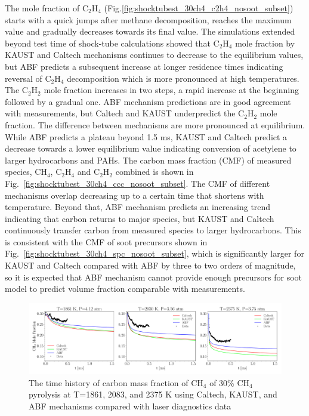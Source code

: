  The mole fraction of $\mathrm{C_2H_4}$ (Fig.\ref{fig:shocktubest_30ch4_c2h4_nosoot_subset}) starts with a quick jumps after methane decomposition, reaches the maximum value and gradually decreases towards its final value. The simulations extended beyond test time of shock-tube calculations showed that $\mathrm{C_2H_4}$ mole fraction by KAUST and Caltech mechanisms continues to decrease to the equilibrium values, but ABF predicts a subsequent increase at longer residence times indicating reversal of $\mathrm{C_2H_4}$ decomposition which is more pronounced at high temperatures. The $\mathrm{C_2H_2}$ mole fraction increases in two steps, a rapid increase at the beginning followed by a gradual one. ABF mechanism predictions are in good agreement with measurements, but Caltech and KAUST underpredict the $\mathrm{C_2H_2}$ mole fraction. The difference between mechanisms are more pronounced at equilibrium. While ABF predicts a plateau beyond 1.5 ms, KAUST and Caltech predict a decrease towards a lower equilibrium value indicating conversion of acetylene to larger hydrocarbons and PAHs. The carbon mass fraction (CMF) of measured species, $\mathrm{CH_4}$, $\mathrm{C_2H_4}$ and $\mathrm{C_2H_2}$ combined is shown in Fig.~\ref{fig:shocktubest_30ch4_ccc_nosoot_subset}. The CMF of different mechanisms overlap decreasing up to a certain time that shortens with temperature. Beyond that, ABF mechanism predicts an increasing trend indicating that carbon returns to major species, but KAUST and Caltech continuously transfer carbon from measured species to larger hydrocarbons. This is consistent with the CMF of soot precursors shown in Fig.~\ref{fig:shocktubest_30ch4_spc_nosoot_subset}, which is significantly larger for KAUST and Caltech compared with ABF by three to two orders of magnitude, so it is expected that ABF mechanism cannot provide enough precursors for soot model to predict volume fraction comparable with measurements.  
 \begin{figure}[H]
 	\centering
 	\includegraphics[width=1\textwidth]{Figures/Results/Shocktube/Stanford/june/30CH4_CH4_mechs_nosoot_subset.pdf}
 	\caption{The time history of carbon mass fraction of $\mathrm{CH_4}$ of 30\% $\mathrm{CH_4}$ pyrolysis at T=1861, 2083, and 2375 K using Caltech, KAUST, and ABF mechanisms compared with laser diagnostics data}
 	\label{fig:shocktubest_30ch4_ch4_nosoot_subset} 
 \end{figure}


